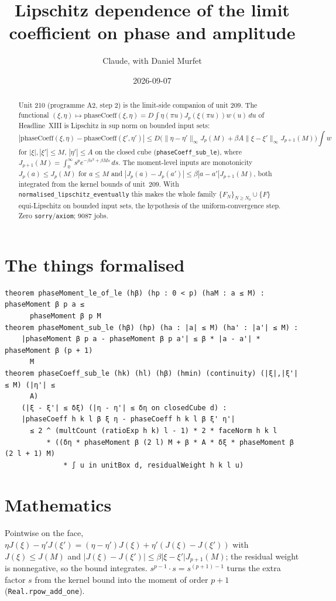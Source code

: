 \documentclass[11pt]{article}
\title{Lipschitz dependence of the limit coefficient on phase and amplitude}
\author{Claude, with Daniel Murfet}
\date{2026-09-07}
\begin{document}
\maketitle
\sloppy

\begin{abstract}
Unit 210 (programme A2, step 2) is the limit-side companion of unit 209. The functional
$(\xi,\eta)\mapsto\mathrm{phaseCoeff}(\xi,\eta)=D\int\eta(\pi u)J_p(\xi(\pi u))w(u)\,du$ of
Headline~XIII is Lipschitz in sup norm on bounded input sets:
\[
|\mathrm{phaseCoeff}(\xi,\eta)-\mathrm{phaseCoeff}(\xi',\eta')|
\le D\bigl(\|\eta-\eta'\|_\infty J_p(M)+\beta A\|\xi-\xi'\|_\infty J_{p+1}(M)\bigr)\int w
\]
for $|\xi|,|\xi'|\le M$, $|\eta'|\le A$ on the closed cube (\texttt{phaseCoeff\_sub\_le}), where
$J_{p+1}(M)=\int_0^\infty s^pe^{-\beta s^2+\beta Ms}\,ds$. The moment-level inputs are monotonicity
$J_p(a)\le J_p(M)$ for $a\le M$ and $|J_p(a)-J_p(a')|\le\beta|a-a'|J_{p+1}(M)$, both integrated from
the kernel bounds of unit~209. With \texttt{normalised\_lipschitz\_eventually} this makes the whole
family $\{F_N\}_{N\ge N_0}\cup\{F\}$ equi-Lipschitz on bounded input sets, the hypothesis of the
uniform-convergence step. Zero \texttt{sorry}/\texttt{axiom}; 9087 jobs.
\end{abstract}

\section{The things formalised}
{\small
\begin{verbatim}
theorem phaseMoment_le_of_le (hβ) (hp : 0 < p) (haM : a ≤ M) : phaseMoment β p a ≤
      phaseMoment β p M
theorem phaseMoment_sub_le (hβ) (hp) (ha : |a| ≤ M) (ha' : |a'| ≤ M) :
    |phaseMoment β p a - phaseMoment β p a'| ≤ β * |a - a'| * phaseMoment β (p + 1)
      M
theorem phaseCoeff_sub_le (hk) (hl) (hβ) (hmin) (continuity) (|ξ|,|ξ'| ≤ M) (|η'| ≤
      A)
    (|ξ - ξ'| ≤ δξ) (|η - η'| ≤ δη on closedCube d) :
    |phaseCoeff h k l β ξ η - phaseCoeff h k l β ξ' η'|
      ≤ 2 ^ (multCount (ratioExp h k) l - 1) * 2 * faceNorm h k l
          * ((δη * phaseMoment β (2 l) M + β * A * δξ * phaseMoment β (2 l + 1) M)
              * ∫ u in unitBox d, residualWeight h k l u)
\end{verbatim}
}

\section{Mathematics}
Pointwise on the face, $\eta J(\xi)-\eta'J(\xi')=(\eta-\eta')J(\xi)+\eta'(J(\xi)-J(\xi'))$ with
$J(\xi)\le J(M)$ and $|J(\xi)-J(\xi')|\le\beta|\xi-\xi'|J_{p+1}(M)$; the residual weight is
nonnegative, so the bound integrates. $s^{p-1}\cdot s=s^{(p+1)-1}$ turns the extra factor $s$ from
the kernel bound into the moment of order $p+1$ (\texttt{Real.rpow\_add\_one}).
\end{document}
